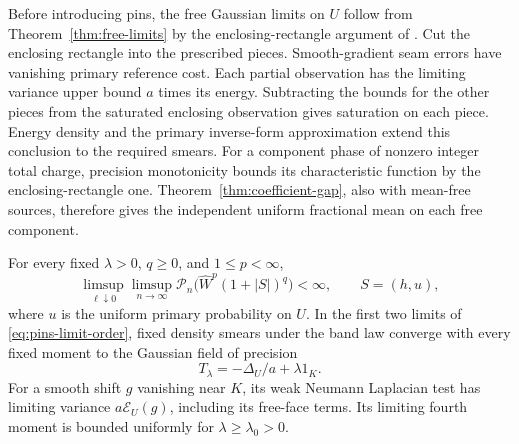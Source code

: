 Before introducing pins, the free Gaussian limits on \(U\) follow
from Theorem~\ref{thm:free-limits} by the enclosing-rectangle
argument of . Cut the enclosing rectangle into
the prescribed pieces. Smooth-gradient seam errors have
vanishing primary reference cost. Each partial observation has
the limiting variance upper bound \(a\) times its energy.
Subtracting the bounds for the other pieces from the saturated
enclosing observation gives saturation on each piece.
Energy density and the primary inverse-form approximation extend
this conclusion to the required smears. For a component phase
of nonzero integer total charge, precision monotonicity bounds
its characteristic function by the enclosing-rectangle one.
Theorem~\ref{thm:coefficient-gap}, also with mean-free sources,
therefore gives the independent uniform fractional mean on each
free component.

\begin{lemma}\label{lem:pins-band-density}
For every fixed \(\lambda>0\), \(q\ge0\), and \(1\le p<\infty\),
\begin{equation}
 \limsup_{\ell\downarrow0}\limsup_{n\to\infty}
 \mathcal P_n\bigl(\widehat W^p(1+|S|)^q\bigr)<\infty,
 \qquad S=(h,u),
 \label{eq:pins-density-moments}
\end{equation}
where \(u\) is the uniform primary probability on \(U\).
In the first two limits of \eqref{eq:pins-limit-order}, fixed
density smears under the band law converge with every fixed
moment to the Gaussian field of precision
\[
                 T_\lambda=-\Delta_U/a+\lambda1_K.
\]
For a smooth shift \(g\) vanishing near \(K\),
its weak Neumann Laplacian test has limiting variance
\(a\mathcal E_U(g)\), including its free-face terms.
Its limiting fourth moment is bounded uniformly for
\(\lambda\ge\lambda_0>0\).
\end{lemma}

